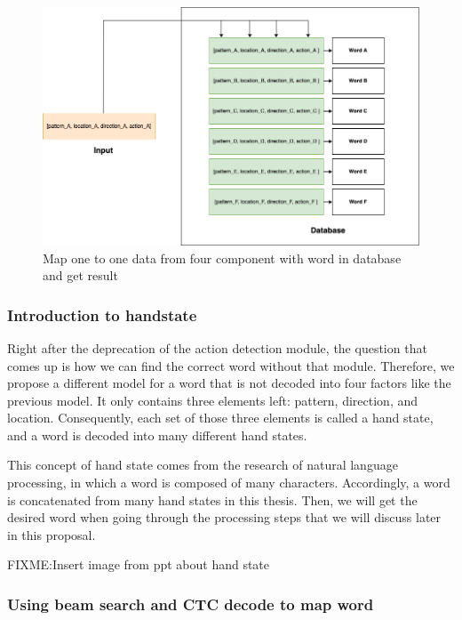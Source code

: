     \begin{figure}[H]
      \centering
      \includegraphics[width=\textwidth]{img/Chap4/MapWord.png}
      \caption{Map one to one data from four component with word in database and get result}
      \label{fig:Chap4-MapWord}
    \end{figure}

    \subsubsection{ Introduction to handstate }

      Right after the deprecation of the action detection module, the question that comes up is how we can find the correct word without that module. Therefore, we propose a different model for a word that is not decoded into four factors like the previous model. It only contains three elements left: pattern, direction, and location. Consequently, each set of those three elements is called a hand state, and a word is decoded into many different hand states.

      This concept of hand state comes from the research of natural language processing, in which a word is composed of many characters. Accordingly, a word is concatenated from many hand states in this thesis. Then, we will get the desired word when going through the processing steps that we will discuss later in this proposal.

      FIXME:Insert image from ppt about hand state

    \subsubsection{ Using beam search and CTC decode to map word}

